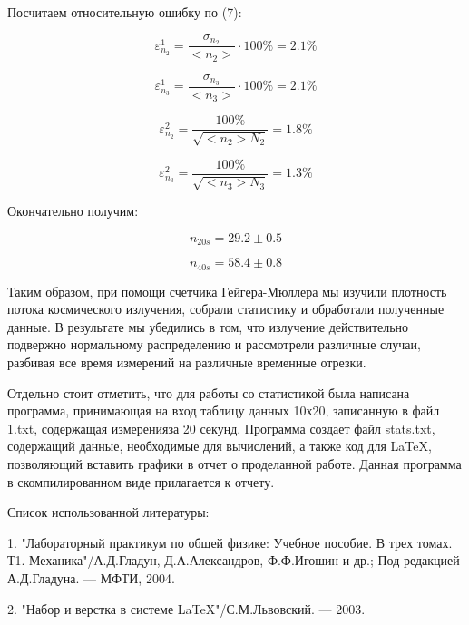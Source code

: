 \documentclass[14pt]{article}
\begin{document}
Посчитаем относительную ошибку по (7):

$$\varepsilon_{n_2}^1 = \frac{\sigma_{n_2}}{<n_2>} \cdot 100\% = 2.1\%$$

$$\varepsilon_{n_3}^1 = \frac{\sigma_{n_3}}{<n_3>} \cdot 100\% = 2.1\%$$

$$\varepsilon_{n_2}^2 = \frac{100\%}{\sqrt{<n_2>N_2}} = 1.8\%$$

$$\varepsilon_{n_3}^2 = \frac{100\%}{\sqrt{<n_3>N_3}} = 1.3\%$$

\vspace{1cm}
Окончательно получим:

$$n_{20s} = 29.2 \pm 0.5$$

$$n_{40s} = 58.4 \pm 0.8$$

\vspace{1cm}
Таким образом, при помощи счетчика Гейгера-Мюллера мы изучили плотность потока космического излучения, собрали статистику и обработали полученные данные. В результате мы убедились в том, что излучение действительно подвержно нормальному распределению и рассмотрели различные случаи, разбивая все время измерений на различные временные отрезки.

\newpage
Отдельно стоит отметить, что для работы со статистикой была написана программа, принимающая на вход таблицу данных 10х20, записанную в файл 1.txt, содержащая измеренияза 20 секунд. Программа создает файл stats.txt, содержащий данные, необходимые для вычислений, а также код для LaTeX, позволяющий вставить графики в отчет о проделанной работе. Данная программа в скомпилированном виде прилагается к отчету. 

\newpage
Список использованной литературы:
	
\vspace{0.5cm}
1. "Лабораторный практикум по общей физике: Учебное пособие. В трех томах. Т1. Механика"/А.Д.Гладун, Д.А.Александров,
Ф.Ф.Игошин и др.; Под редакцией А.Д.Гладуна. --- МФТИ, 2004.
	
2. "Набор и верстка в системе \LaTeX "/С.М.Львовский. --- 2003.
\end{document}
